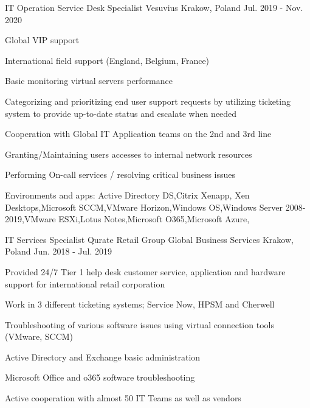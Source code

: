 \begin{cventries}
  \cventry
    {IT Operation Service Desk Specialist} %
    {Vesuvius} %
    {Krakow, Poland} %
    {Jul. 2019 - Nov. 2020} %
    {
      \begin{cvitems} %
        \item {Global VIP support}
        \item {International field support (England, Belgium, France)}
        \item {Basic monitoring virtual servers performance}
        \item {Categorizing and prioritizing end user support requests by utilizing ticketing system to provide up-to-date status and escalate when needed}
        \item { Cooperation with Global IT Application teams on the 2nd and 3rd line}
        \item {Granting/Maintaining users accesses to internal network resources}
        \item {Performing On-call services / resolving critical business issues}
        \item {Environments and apps: Active Directory DS,Citrix Xenapp, Xen Desktops,Microsoft SCCM,VMware Horizon,Windows OS,Windows Server 2008-2019,VMware ESXi,Lotus Notes,Microsoft O365,Microsoft Azure,}
      \end{cvitems}
    }

  \cventry
    {IT Services Specialist} %
    {Qurate Retail Group Global Business Services} %
    {Krakow, Poland} %
    {Jun. 2018 - Jul. 2019} %
    {
      \begin{cvitems} %
        \item {Provided 24/7 Tier 1 help desk customer service, application and hardware support for international retail corporation}
        \item {Work in 3 different ticketing systems; Service Now, HPSM and Cherwell}
        \item {Troubleshooting of various software issues using virtual connection tools (VMware, SCCM)}
        \item {Active Directory and Exchange basic administration}
        \item {Microsoft Office and o365 software troubleshooting}
        \item {Active cooperation with almost 50 IT Teams as well as vendors}
      \end{cvitems}
    }


\end{cventries}
